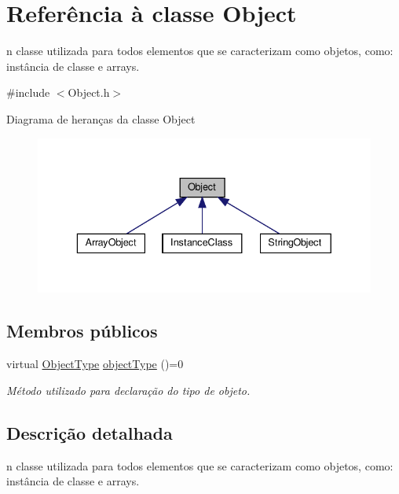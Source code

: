 \hypertarget{classObject}{}\section{Referência à classe Object}
\label{classObject}


n classe utilizada para todos elementos que se caracterizam como objetos, como\+: instância de classe e arrays.  




{\ttfamily \#include $<$Object.\+h$>$}



Diagrama de heranças da classe Object\nopagebreak
\begin{figure}[H]
\begin{center}
\leavevmode
\includegraphics[width=336pt]{classObject__inherit__graph}
\end{center}
\end{figure}
\subsection*{Membros públicos}
\begin{DoxyCompactItemize}
\item 
virtual \hyperlink{BasicTypes_8h_a842c5e2e69277690b064bf363c017980}{Object\+Type} \hyperlink{classObject_a08cee945bc224fc81f4448086625183d}{object\+Type} ()=0
\begin{DoxyCompactList}\small\item\em Método utilizado para declaração do tipo de objeto. \end{DoxyCompactList}\end{DoxyCompactItemize}


\subsection{Descrição detalhada}
n classe utilizada para todos elementos que se caracterizam como objetos, como\+: instância de classe e arrays. 

